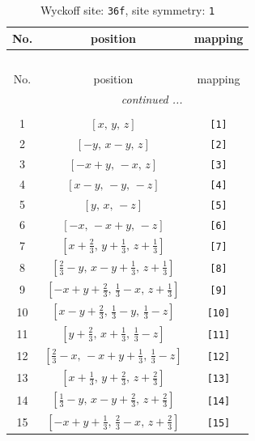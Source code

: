 \documentclass[fleqn,8pt]{jsarticle}
\begin{document}
\renewcommand{\arraystretch}{1.2}
\begin{longtable}{ccc}
\caption{Wyckoff site: {\tt 36f}, site symmetry: {\tt 1}}
 \\
 \hline \hline
No. & position & mapping \\ \hline \endfirsthead

\multicolumn{2}{l}{\tablename\ \thetable{}} \\
 \hline \hline
No. & position & mapping \\ \hline \endhead

 \hline \hline
\multicolumn{2}{r}{\footnotesize\it continued ...} \\ \endfoot

 \hline \hline
\multicolumn{2}{r}{} \\ \endlastfoot

1 & $\left[ x,\, y,\, z \right]$ & {\tt [1]} \\ \hline
2 & $\left[ - y,\, x - y,\, z \right]$ & {\tt [2]} \\ \hline
3 & $\left[ - x + y,\, - x,\, z \right]$ & {\tt [3]} \\ \hline
4 & $\left[ x - y,\, - y,\, - z \right]$ & {\tt [4]} \\ \hline
5 & $\left[ y,\, x,\, - z \right]$ & {\tt [5]} \\ \hline
6 & $\left[ - x,\, - x + y,\, - z \right]$ & {\tt [6]} \\ \hline
7 & $\left[ x + \frac{2}{3},\, y + \frac{1}{3},\, z + \frac{1}{3} \right]$ & {\tt [7]} \\ \hline
8 & $\left[ \frac{2}{3} - y,\, x - y + \frac{1}{3},\, z + \frac{1}{3} \right]$ & {\tt [8]} \\ \hline
9 & $\left[ - x + y + \frac{2}{3},\, \frac{1}{3} - x,\, z + \frac{1}{3} \right]$ & {\tt [9]} \\ \hline
10 & $\left[ x - y + \frac{2}{3},\, \frac{1}{3} - y,\, \frac{1}{3} - z \right]$ & {\tt [10]} \\ \hline
11 & $\left[ y + \frac{2}{3},\, x + \frac{1}{3},\, \frac{1}{3} - z \right]$ & {\tt [11]} \\ \hline
12 & $\left[ \frac{2}{3} - x,\, - x + y + \frac{1}{3},\, \frac{1}{3} - z \right]$ & {\tt [12]} \\ \hline
13 & $\left[ x + \frac{1}{3},\, y + \frac{2}{3},\, z + \frac{2}{3} \right]$ & {\tt [13]} \\ \hline
14 & $\left[ \frac{1}{3} - y,\, x - y + \frac{2}{3},\, z + \frac{2}{3} \right]$ & {\tt [14]} \\ \hline
15 & $\left[ - x + y + \frac{1}{3},\, \frac{2}{3} - x,\, z + \frac{2}{3} \right]$ & {\tt [15]} \\ \hline

\end{longtable}
\end{document}
